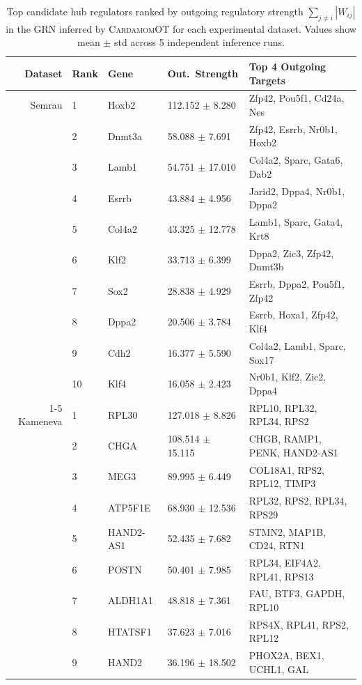\begin{table}[ht]
\centering
\caption{Top  candidate hub regulators ranked by outgoing regulatory strength $\sum_{j\neq i}|W_{ij}|$ in the GRN inferred by \textsc{CardamomOT} for each experimental dataset. Values show mean $\pm$ std across 5 independent inference runs.}
\label{tableS3}
\small
\begin{tabularx}{\textwidth}{r l l l X}
\toprule
Dataset & Rank & Gene & Out.\ Strength & Top 4 Outgoing Targets \\
\midrule
Semrau & 1 & Hoxb2 & 112.152 $\pm$ 8.280 & Zfp42, Pou5f1, Cd24a, Nes \\
 & 2 & Dnmt3a & 58.088 $\pm$ 7.691 & Zfp42, Esrrb, Nr0b1, Hoxb2 \\
 & 3 & Lamb1 & 54.751 $\pm$ 17.010 & Col4a2, Sparc, Gata6, Dab2 \\
 & 4 & Esrrb & 43.884 $\pm$ 4.956 & Jarid2, Dppa4, Nr0b1, Dppa2 \\
 & 5 & Col4a2 & 43.325 $\pm$ 12.778 & Lamb1, Sparc, Gata4, Krt8 \\
 & 6 & Klf2 & 33.713 $\pm$ 6.399 & Dppa2, Zic3, Zfp42, Dnmt3b \\
 & 7 & Sox2 & 28.838 $\pm$ 4.929 & Esrrb, Dppa2, Pou5f1, Zfp42 \\
 & 8 & Dppa2 & 20.506 $\pm$ 3.784 & Esrrb, Hoxa1, Zfp42, Klf4 \\
 & 9 & Cdh2 & 16.377 $\pm$ 5.590 & Col4a2, Lamb1, Sparc, Sox17 \\
 & 10 & Klf4 & 16.058 $\pm$ 2.423 & Nr0b1, Klf2, Zic2, Dppa4 \\
\cmidrule{1-5}
Kameneva & 1 & RPL30 & 127.018 $\pm$ 8.826 & RPL10, RPL32, RPL34, RPS2 \\
 & 2 & CHGA & 108.514 $\pm$ 15.115 & CHGB, RAMP1, PENK, HAND2-AS1 \\
 & 3 & MEG3 & 89.995 $\pm$ 6.449 & COL18A1, RPS2, RPL12, TIMP3 \\
 & 4 & ATP5F1E & 68.930 $\pm$ 12.536 & RPL32, RPS2, RPL34, RPS29 \\
 & 5 & HAND2-AS1 & 52.435 $\pm$ 7.682 & STMN2, MAP1B, CD24, RTN1 \\
 & 6 & POSTN & 50.401 $\pm$ 7.985 & RPL34, EIF4A2, RPL41, RPS13 \\
 & 7 & ALDH1A1 & 48.818 $\pm$ 7.361 & FAU, BTF3, GAPDH, RPL10 \\
 & 8 & HTATSF1 & 37.623 $\pm$ 7.016 & RPS4X, RPL41, RPS2, RPL12 \\
 & 9 & HAND2 & 36.196 $\pm$ 18.502 & PHOX2A, BEX1, UCHL1, GAL \\

\end{tabularx}
\end{table}
